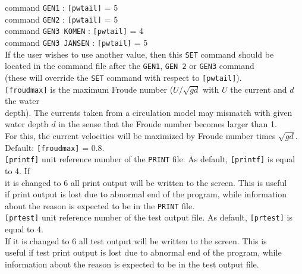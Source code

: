 \documentclass[12pt]{book}
\begin{document}
\begin{tabbing}
                   command {\tt GEN1}        \>: {\tt [pwtail]} = 5\\
                   command {\tt GEN2}        \>: {\tt [pwtail]} = 5\\
                   command {\tt GEN3 KOMEN}  \>: {\tt [pwtail]} = 4\\
                   command {\tt GEN3 JANSEN} \>: {\tt [pwtail]} = 5\\
                   \poptabs
                   If the user wishes to use another value, then this {\tt SET} command should be\\
                   located in the command file after the {\tt GEN1}, {\tt GEN 2} or {\tt GEN3} command\\
                   (these will override the {\tt SET} command with respect to {\tt [pwtail]}).\-\\
{\tt [froudmax]}\> is the maximum Froude number ($U/\sqrt{gd}$ with $U$ the current and $d$ the water\+\\
                   depth). The currents taken from a circulation model may mismatch with given\\
                   water depth $d$ in the sense that the Froude number becomes larger than 1.\\
                   For this, the current velocities will be maximized by Froude number times $\sqrt{gd}$.\\
                   Default: {\tt [froudmax]} = 0.8.\-\\
{\tt [printf]}  \> unit reference number of the {\tt PRINT} file. As default, {\tt [printf]} is equal to 4. If\+\\
                   it is changed to 6 all print output will be written to the screen. This is useful\\
                   if print output is lost due to abnormal end of the program, while information\\
                   about the reason is expected to be in the {\tt PRINT} file.\-\\
{\tt [prtest]}  \> unit reference number of the test output file. As default, {\tt [prtest]} is equal to 4.\+\\
                   If it is changed to 6 all test output will be written to the screen. This is\\
                   useful if test print output is lost due to abnormal end of the program, while\\
                   information about the reason is expected to be in the test output file.\-\\
\end{tabbing}
\end{document}
